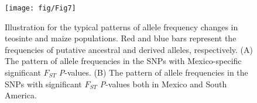 {{%




\begin{figure}[tb]   
  \begin{center}
   \vspace{-0mm}
   \texttt{[image: fig/Fig7]}
   \renewcommand{\baselinestretch}{0.9}
   \vspace{-3mm}
   \caption{Illustration for the typical patterns of allele frequency changes in teosinte and maize populations.  Red and blue bars represent the frequencies of putative ancestral and derived alleles, respectively.  (A) The pattern of allele frequencies in the SNPs with Mexico-specific significant $F_{ST}$ \emph{P}-values.  (B) The pattern of allele frequencies in the SNPs with significant $F_{ST}$ \emph{P}-values both in Mexico and South America.}
\vspace{-6mm}
    \label{tes2}
  \end{center}
\end{figure}











\renewcommand{\arraystretch}{1.1}
\begin{table}[tb]


\end{table}}}
